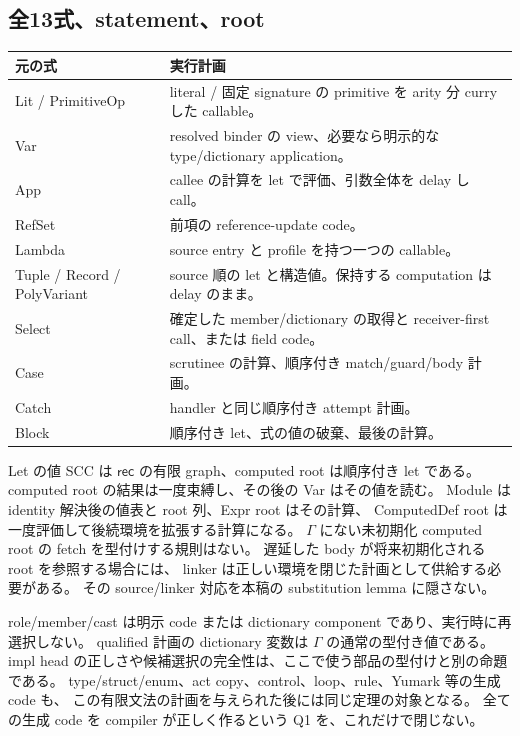 \documentclass[11pt,a4paper]{article}
\begin{document}
\subsection{全13式、statement、root}

\begin{longtable}{p{}p{}}
\toprule
元の式 & 実行計画 \\
\midrule\endhead
Lit / PrimitiveOp & literal / 固定 signature の primitive を arity 分 curry した callable。\\
Var & resolved binder の view、必要なら明示的な type/dictionary application。\\
App & callee の計算を let で評価、引数全体を delay し call。\\
RefSet & 前項の reference-update code。\\
Lambda & source entry と profile を持つ一つの callable。\\
Tuple / Record / PolyVariant & source 順の let と構造値。保持する computation は delay のまま。\\
Select & 確定した member/dictionary の取得と receiver-first call、または field code。\\
Case & scrutinee の計算、順序付き match/guard/body 計画。\\
Catch & handler と同じ順序付き attempt 計画。\\
Block & 順序付き let、式の値の破棄、最後の計算。\\
\bottomrule
\end{longtable}

Let の値 SCC は \(\mathsf{rec}\) の有限 graph、computed root は順序付き let である。
computed root の結果は一度束縛し、その後の Var はその値を読む。
Module は identity 解決後の値表と root 列、Expr root はその計算、
ComputedDef root は一度評価して後続環境を拡張する計算になる。
\(\Gamma\) にない未初期化 computed root の fetch を型付けする規則はない。
遅延した body が将来初期化される root を参照する場合には、
linker は正しい環境を閉じた計画として供給する必要がある。
その source/linker 対応を本稿の substitution lemma に隠さない。

role/member/cast は明示 code または dictionary component であり、実行時に再選択しない。
qualified 計画の dictionary 変数は \(\Gamma\) の通常の型付き値である。
impl head の正しさや候補選択の完全性は、ここで使う部品の型付けと別の命題である。
type/struct/enum、act copy、control、loop、rule、Yumark 等の生成 code も、
この有限文法の計画を与えられた後には同じ定理の対象となる。
全ての生成 code を compiler が正しく作るという Q1 を、これだけで閉じない。
\end{document}
